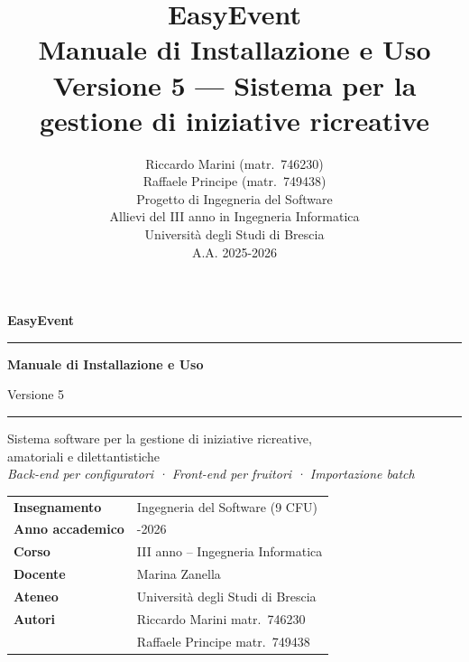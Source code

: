 \documentclass[12pt,a4paper,oneside]{report}
\title{%
  \vspace{-1cm}
  {\sffamily\bfseries\color{BLU}\Huge EasyEvent}\\[6pt]
  {\sffamily\large\color{LBLU} Manuale di Installazione e Uso}\\[4pt]
  {\sffamily\normalsize\color{GRIGIOSCURO} Versione 5 — Sistema per la gestione di iniziative ricreative}
}
\author{%
  {\sffamily Riccardo Marini (matr.\ 746230)}\\
  {\sffamily Raffaele Principe (matr.\ 749438)}\\[4pt]
  {\sffamily Progetto di Ingegneria del Software}\\
  {\sffamily Allievi del III anno in Ingegneria Informatica}\\
  {\sffamily Università degli Studi di Brescia}\\[4pt]
  {\sffamily\small A.A. 2025-2026}
}
\date{}
\begin{document}
\begin{titlepage}
  \centering
  \vspace*{2cm}
  {\sffamily\bfseries\color{BLU}\fontsize{48}{52}\selectfont EasyEvent\par}
  \vspace{0.4cm}
  \rule{\textwidth}{2pt}\par
  \vspace{0.3cm}
  {\sffamily\bfseries\color{LBLU}\LARGE Manuale di Installazione e Uso\par}
  \vspace{0.2cm}
  {\sffamily\large\color{GRIGIOSCURO} Versione 5\par}
  \vspace{0.5cm}
  \rule{\textwidth}{0.4pt}\par
  \vspace{1cm}
  {\sffamily\normalsize
    Sistema software per la gestione di iniziative ricreative,\\
    amatoriali e dilettantistiche\\[8pt]
    \textit{Back-end per configuratori · Front-end per fruitori · Importazione batch}
  \par}
  \vfill
  \begin{tabular}{ll}
    \toprule
    \sffamily\textbf{Insegnamento} & \sffamily Ingegneria del Software (9 CFU) \\
    \sffamily\textbf{Anno accademico} & \sffamily 2025-2026 \\
    \sffamily\textbf{Corso} & \sffamily III anno – Ingegneria Informatica \\
    \sffamily\textbf{Docente} & \sffamily Marina Zanella \\
    \sffamily\textbf{Ateneo} & \sffamily Università degli Studi di Brescia \\
    \midrule
    \sffamily\textbf{Autori} & \sffamily Riccardo Marini \quad matr.\ 746230 \\
                              & \sffamily Raffaele Principe \quad matr.\ 749438 \\
    \bottomrule
  \end{tabular}
  \vspace{1.5cm}
\end{titlepage}

\clearpage
\thispagestyle{empty}
\mbox{}
\clearpage

\end{document}
